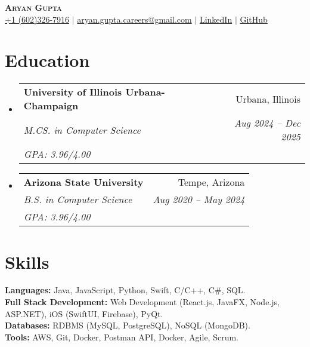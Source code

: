 \documentclass[letterpaper,11pt]{article}
\makeatletter
\newcommand{\resumeEducationHeading}[6]{
  \vspace{-2pt}\item
    \begin{tabular*}{0.97\textwidth}[t]{l@{\extracolsep{\fill}}r}
      \textbf{#1} & #2 \\
      \textit{\small#3} & \textit{\small #4} \\
      \textit{\small#5} & \textit{\small #6} \\
    \end{tabular*}\vspace{-5pt}
}
\newcommand{\resumeSubHeadingListStart}{\begin{itemize}[leftmargin=0.15in, label={}]}
\newcommand{\resumeSubHeadingListEnd}{\end{itemize}}
\makeatother
\begin{document}
\begin{center}
  \textbf{\Huge \scshape Aryan Gupta} \\ \vspace{3pt}
  \small
  \faMobile \hspace{.5pt} \href{tel:6023267916}{+1 (602)326-7916}
  $|$
  \faAt \hspace{.5pt} \href{mailto:aryan.gupta.careers@gmail.com}{aryan.gupta.careers@gmail.com}
  $|$
  \faLinkedinSquare \hspace{.5pt} \href{https://www.linkedin.com/in/agupt295}{LinkedIn}
  $|$
  \faGithub \hspace{.5pt} \href{https://github.com/agupt295}{GitHub}
\end{center}

\section{Education}
\resumeSubHeadingListStart
  \resumeEducationHeading
    {University of Illinois Urbana-Champaign}{Urbana, Illinois}
    {M.CS. in Computer Science}{Aug 2024 -- Dec 2025}{GPA: 3.96/4.00}{}
\resumeSubHeadingListEnd
\vspace{-0.4cm} %
\resumeSubHeadingListStart
  \resumeEducationHeading
    {Arizona State University}{Tempe, Arizona}
    {B.S. in Computer Science}{Aug 2020 -- May 2024}{GPA: 3.96/4.00}{}
\resumeSubHeadingListEnd

\section{Skills}
  \resumeSubHeadingListStart
    \small{\item{
      \textbf{Languages:}{ Java, JavaScript, Python, Swift, C/C++, C\#, SQL. } \\ \vspace{3pt}
      \textbf{Full Stack Development:}{ Web Development (React.js, JavaFX, Node.js, ASP.NET), iOS (SwiftUI, Firebase), PyQt. } \\ \vspace{3pt}
      \textbf{Databases:}{ RDBMS (MySQL, PostgreSQL), NoSQL (MongoDB). } \\ \vspace{3pt}
      \textbf{Tools:}{ AWS, Git, Docker, Postman API, Docker, Agile, Scrum. } \\ \vspace{3pt}
    }}
  \resumeSubHeadingListEnd
\end{document}
